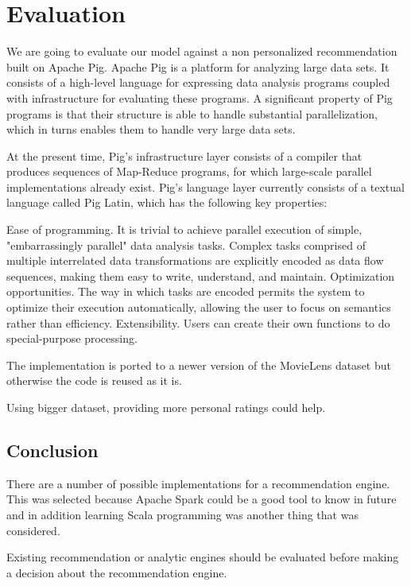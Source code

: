 \documentclass[main.tex]{thesis.tex}
\begin{document}
\chapter{Evaluation}

We are going to evaluate our model against a non personalized recommendation built on Apache Pig. Apache Pig is a platform for analyzing large data sets. It consists of a high-level language for expressing data analysis programs coupled with infrastructure for evaluating these programs.
A significant property of Pig programs is that their structure is able to handle substantial parallelization, which in turns enables them to handle very large data sets. \cite{pig17}

At the present time, Pig's infrastructure layer consists of a compiler that produces sequences of Map-Reduce programs, for which large-scale parallel implementations already exist. Pig's language layer currently consists of a textual language called Pig Latin, which has the following key properties:

Ease of programming. It is trivial to achieve parallel execution of simple, "embarrassingly parallel" data analysis tasks. Complex tasks comprised of multiple interrelated data transformations are explicitly encoded as data flow sequences, making them easy to write, understand, and maintain.
Optimization opportunities. The way in which tasks are encoded permits the system to optimize their execution automatically, allowing the user to focus on semantics rather than efficiency.
Extensibility. Users can create their own functions to do special-purpose processing. \cite{pig17}

The implementation is ported to a newer version of the MovieLens dataset but otherwise the code is reused as it is.

Using bigger dataset, providing more personal ratings could help.

\section{Conclusion}

There are a number of possible implementations for a recommendation engine. This was selected because Apache Spark could be a good tool to know in future and in addition learning Scala programming was another thing that was considered.

Existing recommendation or analytic engines should be evaluated before making a decision about the recommendation engine.
\end{document}
